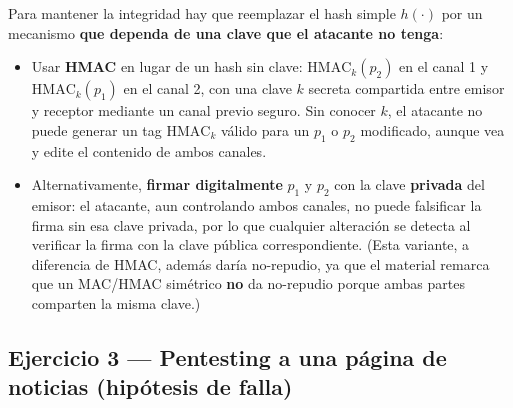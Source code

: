 Para mantener la integridad hay que reemplazar el hash simple $h(\cdot)$ por un mecanismo
\textbf{que dependa de una clave que el atacante no tenga}:
\begin{itemize}
  \item Usar \textbf{HMAC} en lugar de un hash sin clave: $\mathrm{HMAC}_k(p_2)$ en el canal 1
  y $\mathrm{HMAC}_k(p_1)$ en el canal 2, con una clave $k$ secreta compartida entre emisor y
  receptor mediante un canal previo seguro. Sin conocer $k$, el atacante no puede generar un
  tag $\mathrm{HMAC}_k$ válido para un $p_1$ o $p_2$ modificado, aunque vea y edite el
  contenido de ambos canales.
  \item Alternativamente, \textbf{firmar digitalmente} $p_1$ y $p_2$ con la clave
  \textbf{privada} del emisor: el atacante, aun controlando ambos canales, no puede falsificar
  la firma sin esa clave privada, por lo que cualquier alteración se detecta al verificar la
  firma con la clave pública correspondiente. (Esta variante, a diferencia de HMAC, además
  daría no-repudio, ya que el material remarca que un MAC/HMAC simétrico \textbf{no} da
  no-repudio porque ambas partes comparten la misma clave.)
\end{itemize}

\subsection{Ejercicio 3 --- Pentesting a una página de noticias (hipótesis de falla)}

